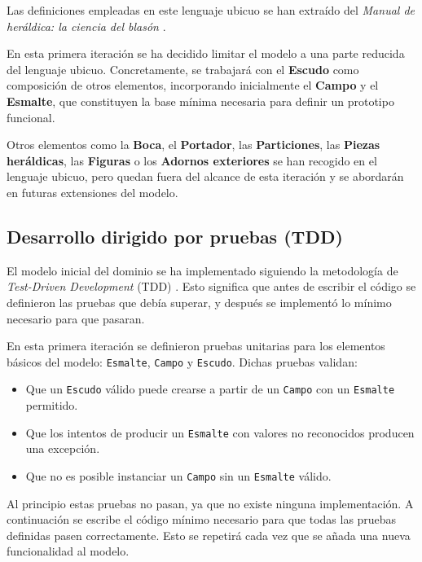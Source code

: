 Las definiciones empleadas en este lenguaje ubicuo se han extraído del 
\textit{Manual de heráldica: la ciencia del blasón} \cite{delgadoHeraldica}.

En esta primera iteración se ha decidido limitar el modelo a una parte reducida del lenguaje ubicuo. 
Concretamente, se trabajará con el \textbf{Escudo} como composición de otros elementos, incorporando 
inicialmente el \textbf{Campo} y el \textbf{Esmalte}, que constituyen la base mínima necesaria para 
definir un prototipo funcional. 

Otros elementos como la \textbf{Boca}, el \textbf{Portador}, las \textbf{Particiones}, las 
\textbf{Piezas heráldicas}, las \textbf{Figuras} o los \textbf{Adornos exteriores} se han recogido 
en el lenguaje ubicuo, pero quedan fuera del alcance de esta iteración y se abordarán en futuras 
extensiones del modelo.

\subsection{Desarrollo dirigido por pruebas (TDD)}

El modelo inicial del dominio se ha implementado siguiendo la metodología de 
\textit{Test-Driven Development} (TDD) \cite{beckTDD}. Esto significa que antes de escribir 
el código se definieron las pruebas que debía superar, y después se implementó lo mínimo necesario 
para que pasaran.

En esta primera iteración se definieron pruebas unitarias para los elementos básicos 
del modelo: \texttt{Esmalte}, \texttt{Campo} y \texttt{Escudo}. Dichas pruebas validan:

\begin{itemize}
    \item Que un \texttt{Escudo} válido puede crearse a partir de un \texttt{Campo} 
    con un \texttt{Esmalte} permitido.
    \item Que los intentos de producir un \texttt{Esmalte} con valores no reconocidos producen 
    una excepción.
    \item Que no es posible instanciar un \texttt{Campo} sin un \texttt{Esmalte} válido.
\end{itemize}

Al principio estas pruebas no pasan, ya que no existe ninguna implementación. A continuación se
escribe el código mínimo necesario para que todas las pruebas definidas pasen correctamente. Esto
se repetirá cada vez que se añada una nueva funcionalidad al modelo.

